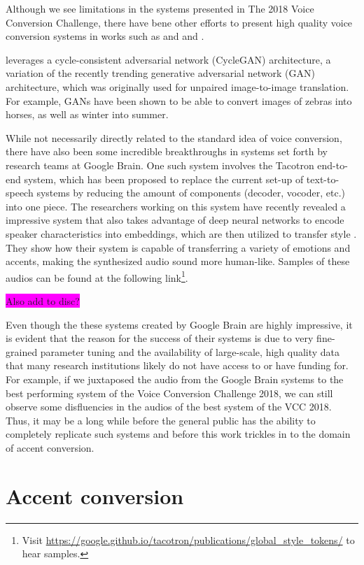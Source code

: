 \documentclass
[
    a4paper,
    twoside,
    12pt,
]
{report}
\begin{document}
Although we see limitations in the systems presented in The 2018 Voice
Conversion Challenge, there have bene other efforts to present high
quality voice conversion systems in works such as and
\textcite{nguyen2016} and \textcite{fang2018}.

\textcite{fang2018} leverages a cycle-consistent adversarial network
(CycleGAN) architecture, a variation of the recently trending generative
adversarial network (GAN) architecture, which was originally used for
unpaired image-to-image translation. For example, GANs have been shown
to be able to convert images of zebras into horses, as well as winter
into summer.

While not necessarily directly related to the standard idea of voice
conversion, there have also been some incredible breakthroughs in
systems set forth by research teams at Google Brain. One such system
involves the Tacotron end-to-end system, which has been proposed to
replace the current set-up of text-to-speech systems by reducing the
amount of components (decoder, vocoder, etc.) into one piece. The
researchers working on this system have recently revealed a impressive
system that also takes advantage of deep neural networks to encode
speaker characteristics into embeddings, which are then utilized to
transfer style \parencite{wang2018}. They show how their system is
capable of transferring a variety of emotions and accents, making the
synthesized audio sound more human-like. Samples of these audios can be
found at the following
link\footnote{Visit \url{https://google.github.io/tacotron/publications/global_style_tokens/} to hear samples.}.

\colorbox{magenta}{Also add to disc?}

Even though the these systems created by Google Brain are highly
impressive, it is evident that the reason for the success of their
systems is due to very fine-grained parameter tuning and the
availability of large-scale, high quality data that many research
institutions likely do not have access to or have funding for. For
example, if we juxtaposed the audio from the Google Brain systems to the
best performing system of the Voice Conversion Challenge 2018, we can
still observe some disfluencies in the audios of the best system of the
VCC 2018. Thus, it may be a long while before the general public has the
ability to completely replicate such systems and before this work
trickles in to the domain of accent conversion.

\hypertarget{accent-conversion}{%
\section{Accent conversion}\label{accent-conversion}}
\end{document}
